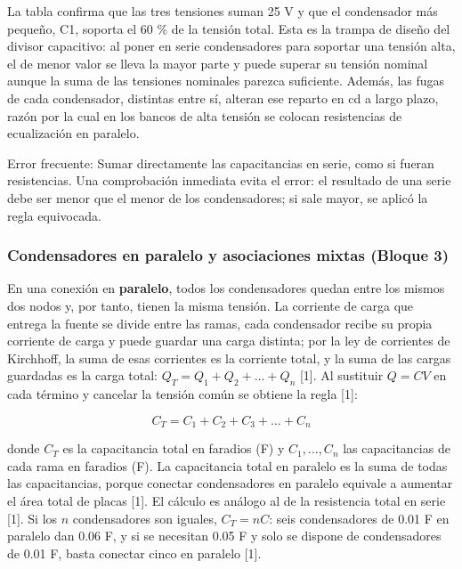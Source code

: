 \documentclass[11pt,letterpaper]{article}
\begin{document}
La tabla confirma que las tres tensiones suman 25 V y que el condensador más pequeño, C1, soporta el 60 \% de la tensión total. Esta es la trampa de diseño del divisor capacitivo: al poner en serie condensadores para soportar una tensión alta, el de menor valor se lleva la mayor parte y puede superar su tensión nominal aunque la suma de las tensiones nominales parezca suficiente. Además, las fugas de cada condensador, distintas entre sí, alteran ese reparto en cd a largo plazo, razón por la cual en los bancos de alta tensión se colocan resistencias de ecualización en paralelo.

\begin{nota}{Error frecuente:}
Sumar directamente las capacitancias en serie, como si fueran resistencias. Una comprobación inmediata evita el error: el resultado de una serie debe ser menor que el menor de los condensadores; si sale mayor, se aplicó la regla equivocada.
\end{nota}

\subsubsection{Condensadores en paralelo y asociaciones mixtas (Bloque 3)}

En una conexión en \textbf{paralelo}, todos los condensadores quedan entre los mismos dos nodos y, por tanto, tienen la misma tensión. La corriente de carga que entrega la fuente se divide entre las ramas, cada condensador recibe su propia corriente de carga y puede guardar una carga distinta; por la ley de corrientes de Kirchhoff, la suma de esas corrientes es la corriente total, y la suma de las cargas guardadas es la carga total: $Q_T = Q_1 + Q_2 + \dots + Q_n$ [1]. Al sustituir $Q = CV$ en cada término y cancelar la tensión común se obtiene la regla [1]:

\begin{equation}
  C_T = C_1 + C_2 + C_3 + \dots + C_n
\end{equation}

donde $C_T$ es la capacitancia total en faradios (F) y $C_1, \dots, C_n$ las capacitancias de cada rama en faradios (F). La capacitancia total en paralelo es la suma de todas las capacitancias, porque conectar condensadores en paralelo equivale a aumentar el área total de placas [1]. El cálculo es análogo al de la resistencia total en serie [1]. Si los $n$ condensadores son iguales, $C_T = nC$: seis condensadores de 0.01 \textmu{}F en paralelo dan 0.06 \textmu{}F, y si se necesitan 0.05 \textmu{}F y solo se dispone de condensadores de 0.01 \textmu{}F, basta conectar cinco en paralelo [1].
\end{document}
